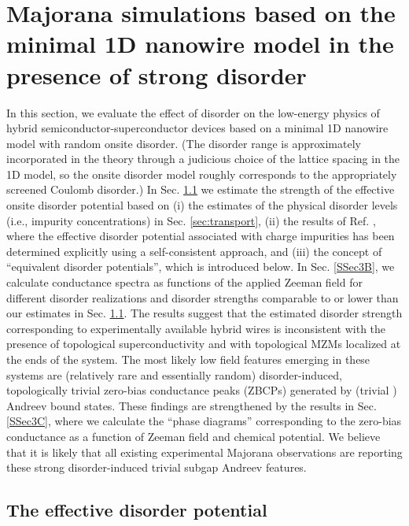 \documentclass[aps,prmaterials,twocolumn,superscriptaddress,longbibliography]{revtex4-2}
\begin{document}
\section{Majorana simulations based on the minimal 1D nanowire model in the presence of strong disorder}\label{sec:nw}


In this section, we evaluate the effect of disorder on the low-energy physics of hybrid semiconductor-superconductor devices based on a minimal 1D nanowire model with random onsite disorder. (The disorder range is approximately incorporated in the theory through a judicious choice of the lattice spacing in the 1D model, so the onsite disorder model roughly corresponds to the appropriately screened Coulomb disorder.) In Sec. \ref{SSec3A} we estimate the strength of the effective onsite disorder potential based on (i) the estimates of the physical disorder levels (i.e., impurity concentrations) in Sec. \ref{sec:transport}, (ii) the results of Ref. , where the effective disorder potential associated with charge impurities has been determined explicitly using a self-consistent approach, and (iii) the concept of ``equivalent disorder potentials'', which is introduced below. In Sec. \ref{SSec3B}, we calculate conductance spectra as functions of the applied Zeeman field for different disorder realizations and disorder strengths comparable to or lower than our estimates in Sec. \ref{SSec3A}. The results suggest that the estimated disorder strength corresponding to experimentally available hybrid wires is inconsistent with the presence of topological superconductivity and with topological MZMs localized at the ends of the system. The most likely low field features emerging in these systems are (relatively rare and essentially random) disorder-induced, topologically trivial zero-bias conductance peaks (ZBCPs) generated by (trivial ) Andreev bound states. These findings are strengthened by the results in Sec.   \ref{SSec3C}, where we calculate the ``phase diagrams''  corresponding to the zero-bias conductance as a function of Zeeman field and chemical potential. We believe that it is likely that all existing experimental Majorana observations are reporting these strong disorder-induced trivial subgap Andreev features.

\subsection{The effective disorder potential} \label{SSec3A} %
\end{document}
